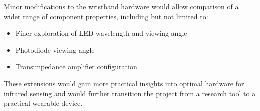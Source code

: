 \documentclass[ oneside,%
                    author={Jack Jarvis},
                    degree={BSc},
                     title={FlexIR: Flexible PCB Wristbands for Infrared Based Gesture Recognition},
                    unit={COMS30045},
                    subtitle={Investigating the Effect of LED Viewing Angle on Gesture Classification in Infrared Sensing Systems}]{dissertation}
\begin{document}
Minor modifications to the wristband hardware would allow comparison of a wider range of component properties, including but not limited to:
\begin{itemize}
    \item Finer exploration of LED wavelength and viewing angle
    \item Photodiode viewing angle
    \item Transimpedance amplifier configuration 
\end{itemize}

These extensions would gain more practical insights into optimal hardware for infrared sensing and would further transition the project from a research tool to a practical wearable device.




\end{document}
